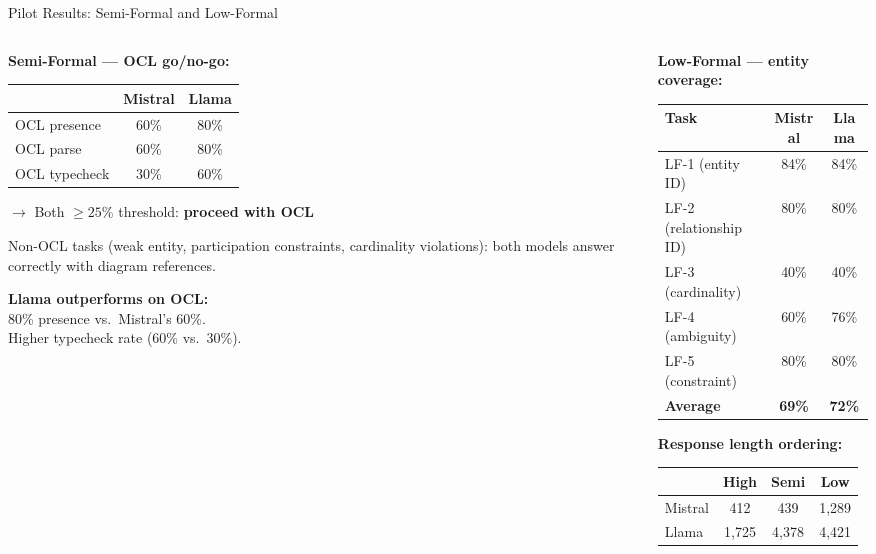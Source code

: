\documentclass[aspectratio=169]{beamer}
\begin{document}
\begin{frame}{Pilot Results: Semi-Formal and Low-Formal}

\begin{columns}[T]
\begin{column}{0.48\textwidth}
\textbf{Semi-Formal --- OCL go/no-go:}\\[0.3em]
{\small
\begin{tabular}{@{}lcc@{}}
\toprule
& Mistral & Llama \\
\midrule
OCL presence & 60\% & 80\% \\
OCL parse & 60\% & 80\% \\
OCL typecheck & 30\% & 60\% \\
\bottomrule
\end{tabular}
}

\vspace{0.3em}
$\rightarrow$ Both $\geq 25\%$ threshold: \textbf{proceed with OCL}

\vspace{0.5em}
{\small Non-OCL tasks (weak entity, participation constraints, cardinality violations): both models answer correctly with diagram references.}

\vspace{0.5em}
\textbf{Llama outperforms on OCL:}\\
{\small 80\% presence vs.\ Mistral's 60\%.\\Higher typecheck rate (60\% vs.\ 30\%).}
\end{column}

\begin{column}{0.48\textwidth}
\textbf{Low-Formal --- entity coverage:}\\[0.3em]
{\small
\begin{tabular}{@{}lcc@{}}
\toprule
Task & Mistral & Llama \\
\midrule
LF-1 (entity ID) & 84\% & 84\% \\
LF-2 (relationship ID) & 80\% & 80\% \\
LF-3 (cardinality) & 40\% & 40\% \\
LF-4 (ambiguity) & 60\% & 76\% \\
LF-5 (constraint) & 80\% & 80\% \\
\midrule
\textbf{Average} & \textbf{69\%} & \textbf{72\%} \\
\bottomrule
\end{tabular}
}

\vspace{0.5em}
\textbf{Response length ordering:}\\[0.2em]
{\small
\begin{tabular}{@{}lccc@{}}
& High & Semi & Low \\
\midrule
Mistral & 412 & 439 & 1{,}289 \\
Llama & 1{,}725 & 4{,}378 & 4{,}421 \\
\end{tabular}
}


\end{column}
\end{columns}
\end{frame}
\end{document}
